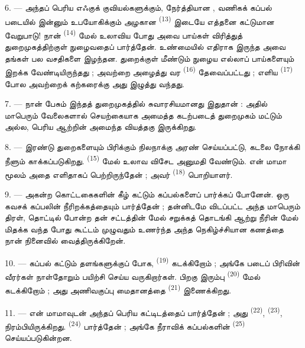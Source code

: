 6. --- அந்தப் பெரிய எஃகுக் குவியல்களுக்கும், நேர்த்தியான
, வணிகக் கப்பல் படையில் இன்னும்
உபயோகிக்கும் அழகான 
\textsuperscript{(13)} இடையே எத்தனை கட்டுமான வேறுபாடு! நான்
 \textsuperscript{(14)} மேல் உலாவிய போது அவை
பாய்கள் விரித்துத் துறைமுகத்திற்குள் நுழைவதைப் பார்த்தேன்.
உண்மையில்  எதிராக இருந்த  அவை தங்கள்
பல வசதிகளை இழந்தன. துறைக்குள் மீண்டும் நுழைய எல்லாப் பாய்களையும்
இறக்க வேண்டியிருந்தது ; அவற்றை அழைத்து வர 
\textsuperscript{(16)} தேவைப்பட்டது ; எளிய 
\textsuperscript{(17)} போல அவற்றைக் கற்கரைக்கு அது இழுத்து வந்தது.

\VUsaut{3.0mm}
\VUsaut{3.0mm}

7. --- நான் பேசும் இந்தத் துறைமுகத்தில் சுவாரசியமானது இதுதான் : அதில்
மாபெரும் வேலைகளால் செயற்கையாக அமைத்த கடற்படைத் துறைமுகம் மட்டும்
அல்ல, பெரிய ஆற்றின்  அமைந்த வியத்தகு
 இருக்கிறது.

8. --- இரண்டு துறைகளையும் பிரிக்கும் நிலநாக்கு அரண் செய்யப்பட்டு,
கடலை நோக்கி நீளும்  
காக்கப்படுகிறது.  \textsuperscript{(15)} மேல் உலாவ
விசேட அனுமதி வேண்டும். என் மாமா மூலம் அதை எளிதாகப் பெற்றிருந்தேன் ;
அவர்  \textsuperscript{(18)}
பொறியாளர்.

9. --- அகன்ற கொட்டகைகளின் கீழ் கட்டும் கப்பல்களைப் பார்க்கப் போனேன்.
ஒரு கவசக் கப்பலின் நீரிறக்கத்தையும் பார்த்தேன் ; தன்னிடமே விடப்பட்ட
அந்த மாபெரும் திரள், தொட்டில் போன்ற தன் சட்டத்தின் மேல் சறுக்கத்
தொடங்கி ஆற்று நீரின் மேல் மிதக்க வந்த போது கூட்டம் முழுவதும் உணர்ந்த
அந்த நெகிழ்ச்சியான கணத்தை நான் நினைவில் வைத்திருக்கிறேன்.

10. --- கப்பல் கட்டும் தளங்களுக்குப் போக, 
\textsuperscript{(19)} கடக்கிறோம் ; அங்கே படைப் பிரிவின் வீரர்கள்
நாள்தோறும் பயிற்சி செய்ய வருகிறார்கள். பிறகு இரும்பு  \textsuperscript{(20)} மேல் கடக்கிறோம் ; அது அணிவகுப்பு
மைதானத்தை  \textsuperscript{(21)}
இணைக்கிறது.

\VUsaut{3.0mm}
\VUsaut{3.0mm}

11. --- என் மாமாவுடன் அந்தப் பெரிய கட்டிடத்தைப் பார்த்தேன் ; அது
 \textsuperscript{(22)}, 
\textsuperscript{(23)},  நிரம்பியிருக்கிறது.
 \textsuperscript{(24)} பார்த்தேன் ;
அங்கே நீராவிக் கப்பல்களின் 
\textsuperscript{(25)} செய்யப்படுகின்றன.

